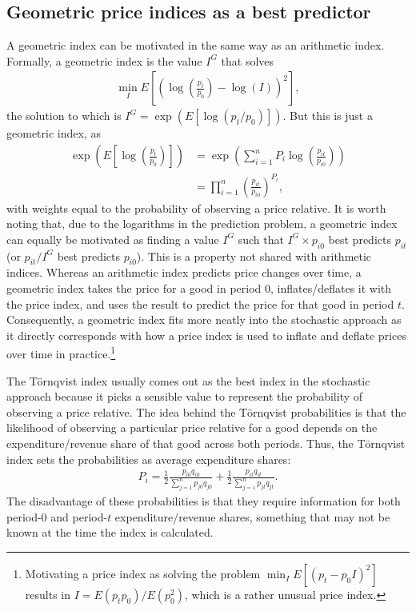\documentclass[
]{article}
\begin{document}
\hypertarget{geometric-price-indices-as-a-best-predictor}{%
\subsection{Geometric price indices as a best predictor}\label{geometric-price-indices-as-a-best-predictor}}

A geometric index can be motivated in the same way as an arithmetic index. Formally, a geometric index is the value \(I^{G}\) that solves
\begin{align*}
\min_{I} E\left[\left(\log\left(\frac{p_{t}}{p_{0}}\right) - \log(I) \right)^{2}\right],
\end{align*}
the solution to which is \(I^{G} = \exp(E[\log(p_{t} / p_{0})])\). But this is just a geometric index, as
\begin{align*}
\exp\left(E\left[\log\left(\frac{p_{t}}{p_{0}}\right)\right]\right) &= \exp\left(\sum_{i = 1}^{n} P_{i} \log\left(\frac{p_{it}}{p_{i0}}\right)\right) \\
&= \prod_{i = 1}^{n} \left(\frac{p_{it}}{p_{i0}}\right)^{P_{i}},
\end{align*}
with weights equal to the probability of observing a price relative. It is worth noting that, due to the logarithms in the prediction problem, a geometric index can equally be motivated as finding a value \(I^{G}\) such that \(I^{G} \times p_{i0}\) best predicts \(p_{it}\) (or \(p_{it} / I^{G}\) best predicts \(p_{i0}\)). This is a property not shared with arithmetic indices. Whereas an arithmetic index predicts price changes over time, a geometric index takes the price for a good in period 0, inflates/deflates it with the price index, and uses the result to predict the price for that good in period \(t\). Consequently, a geometric index fits more neatly into the stochastic approach as it directly corresponds with how a price index is used to inflate and deflate prices over time in practice.\footnote{Motivating a price index as solving the problem \(\min_{I} E[(p_{t} - p_{0} I)^{2}]\) results in \(I = E(p_{t} p_{0}) / E(p_{0}^{2})\), which is a rather unusual price index.}

The Törnqvist index usually comes out as the best index in the stochastic approach because it picks a sensible value to represent the probability of observing a price relative. The idea behind the Törnqvist probabilities is that the likelihood of observing a particular price relative for a good depends on the expenditure/revenue share of that good across both periods. Thus, the Törnqvist index sets the probabilities as average expenditure shares:
\begin{align*}
P_{i} = \frac{1}{2} \frac{p_{i0}q_{i0}}{\sum_{j = 1}^{n} p_{j0}q_{j0}} + \frac{1}{2} \frac{p_{it}q_{it}}{\sum_{j = 1}^{n} p_{jt}q_{jt}}.
\end{align*}
The disadvantage of these probabilities is that they require information for both period-0 and period-\(t\) expenditure/revenue shares, something that may not be known at the time the index is calculated.
\end{document}
